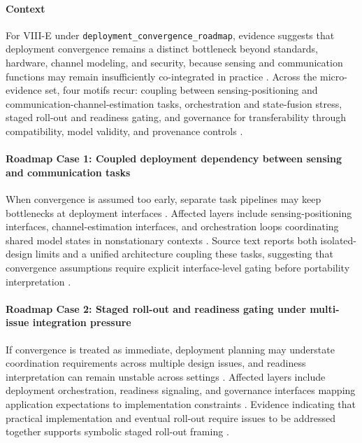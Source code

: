 \documentclass[lettersize,journal]{IEEEtran}
\begin{document}
\paragraph{Context}
For VIII-E under \texttt{deployment\_convergence\_roadmap}, evidence suggests that deployment convergence remains a distinct bottleneck beyond standards, hardware, channel modeling, and security, because sensing and communication functions may remain insufficiently co-integrated in practice \cite{O_ISAC_039}. Across the micro-evidence set, four motifs recur: coupling between sensing-positioning and communication-channel-estimation tasks, orchestration and state-fusion stress, staged roll-out and readiness gating, and governance for transferability through compatibility, model validity, and provenance controls \cite{O_ISAC_039, O_ISAC_151, O_ISAC_163, O_ISAC_200}.

\paragraph{Roadmap Case 1: Coupled deployment dependency between sensing and communication tasks}
When convergence is assumed too early, separate task pipelines may keep bottlenecks at deployment interfaces \cite{O_ISAC_039}. Affected layers include sensing-positioning interfaces, channel-estimation interfaces, and orchestration loops coordinating shared model states in nonstationary contexts \cite{O_ISAC_039}. Source text reports both isolated-design limits and a unified architecture coupling these tasks, suggesting that convergence assumptions require explicit interface-level gating before portability interpretation \cite{O_ISAC_039}.

\paragraph{Roadmap Case 2: Staged roll-out and readiness gating under multi-issue integration pressure}
If convergence is treated as immediate, deployment planning may understate coordination requirements across multiple design issues, and readiness interpretation can remain unstable across settings \cite{O_ISAC_163}. Affected layers include deployment orchestration, readiness signaling, and governance interfaces mapping application expectations to implementation constraints \cite{O_ISAC_163}. Evidence indicating that practical implementation and eventual roll-out require issues to be addressed together supports symbolic staged roll-out framing \cite{O_ISAC_163}.
\end{document}
